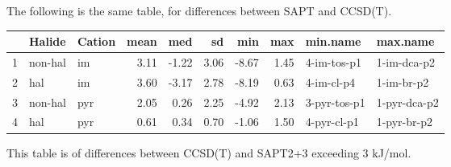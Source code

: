 \documentclass[a4paper]{article}
\begin{document}
\begin{landscape}
The following is the same table, for differences between SAPT and CCSD(T).

\begin{table}[ht]
\centering
\begin{tabular}{rllrrrrrll}
  \hline
 & Halide & Cation & mean & med & sd & min & max & min.name & max.name \\ 
  \hline
1 & non-hal & im & 3.11 & -1.22 & 3.06 & -8.67 & 1.45 & 4-im-tos-p1 & 1-im-dca-p2 \\ 
  2 & hal & im & 3.60 & -3.17 & 2.78 & -8.19 & 0.63 & 4-im-cl-p4 & 1-im-br-p2 \\ 
  3 & non-hal & pyr & 2.05 & 0.26 & 2.25 & -4.92 & 2.13 & 3-pyr-tos-p1 & 1-pyr-dca-p2 \\ 
  4 & hal & pyr & 0.61 & 0.34 & 0.70 & -1.06 & 1.50 & 4-pyr-cl-p1 & 1-pyr-br-p2 \\ 
   \hline
\end{tabular}
\end{table}

\end{landscape}

This table is of differences between CCSD(T) and SAPT2+3 exceeding 3 kJ/mol.
\end{document}

